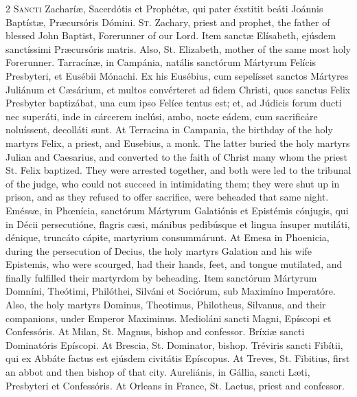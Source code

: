 \begin{paracol}{2}
\lettrine[lines=2]{S}{ancti} Zacharíæ, 
 Sacerdótis et Prophétæ, qui pater éxstitit beáti Joánnis Baptístæ, 
 Præcursóris Dómini.
\switchcolumn
{}
\lettrine[lines=2]{S}{t.} Zachary, priest and prophet, the 
 father of blessed John Baptist, Forerunner of our Lord.
\switchcolumn*
{}
Item sanctæ Elísabeth, 
 ejúsdem sanctíssimi Præcursóris matris.
\switchcolumn
{}
Also, St. Elizabeth, mother of the 
 same most holy Forerunner.
\switchcolumn*
{}
Tarracínæ, in Campánia, natális sanctórum Mártyrum Felícis Presbyteri, et Eusébii Mónachi. Ex 
 his Eusébius, cum sepelísset sanctos Mártyres Juliánum et Cæsárium, et 
 multos convérteret ad fidem Christi, quos sanctus Felix Presbyter baptizábat, 
 una cum ipso Felíce tentus est; et, ad Júdicis forum ducti nec superáti, 
 inde in cárcerem inclúsi, ambo, nocte eádem, cum sacrificáre noluíssent, 
 decolláti sunt.
\switchcolumn
{}
At Terracina in Campania, the 
 birthday of the holy martyrs Felix, a priest, and Eusebius, a monk. 
 The latter buried the holy martyrs Julian and Caesarius, and converted to 
 the faith of Christ many whom the priest St. Felix baptized. They were 
 arrested together, and both were led to the tribunal of the judge, who could 
 not succeed in intimidating them; they were shut up in prison, and as they 
 refused to offer sacrifice, were beheaded that same night.
\switchcolumn*
{}
Eméssæ, in Phœnícia, 
 sanctórum Mártyrum Galatiónis et Epistémis cónjugis, qui in Décii 
 persecutióne, flagris cæsi, mánibus pedibúsque et lingua ínsuper mutiláti, 
 dénique, truncáto cápite, martyrium consummárunt.
\switchcolumn
{}
At Emesa in Phoenicia, during the 
 persecution of Decius, the holy martyrs Galation and his wife Epistemis, who 
 were scourged, had their hands, feet, and tongue mutilated, and finally 
 fulfilled their martyrdom by beheading.
\switchcolumn*
{}
Item sanctórum Mártyrum 
 Domníni, Theótimi, Philóthei, Silváni et Sociórum, sub Maximíno Imperatóre.
\switchcolumn
{}
Also, the holy martyrs Dominus, 
 Theotimus, Philotheus, Silvanus, and their companions, under Emperor 
 Maximinus.
\switchcolumn*
{}
Medioláni sancti Magni, 
 Epíscopi et Confessóris.
\switchcolumn
{}
At Milan, St. Magnus, bishop and 
 confessor.
\switchcolumn*
{}
Bríxiæ sancti 
 Dominatóris Epíscopi.
\switchcolumn
{}
At Brescia, St. Dominator, bishop.
\switchcolumn*
{}
Tréviris sancti Fibítii, 
 qui ex Abbáte factus est ejúsdem civitátis Epíscopus.
\switchcolumn
{}
At Treves, St. Fibitius, first an 
 abbot and then bishop of that city.
\switchcolumn*
{}
Aureliánis, in Gállia, 
 sancti Læti, Presbyteri et Confessóris.
\switchcolumn
{}
At Orleans in France, St. Laetus, 
 priest and confessor.
\switchcolumn*
{}
\end{paracol}


